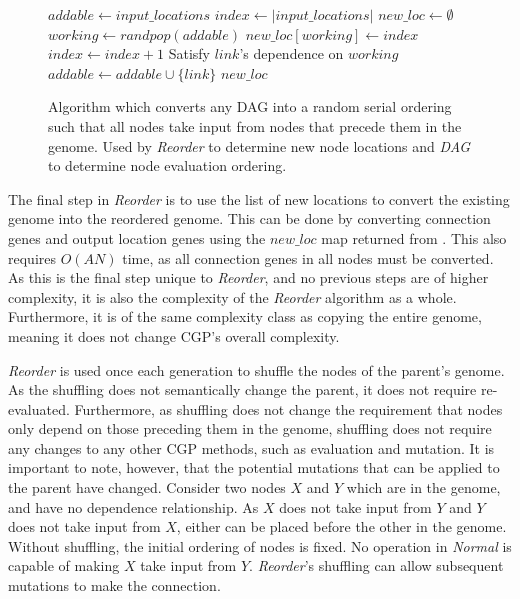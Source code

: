 \documentclass[journal]{IEEEtran}
\begin{document}
\begin{figure}
  \begin{algorithmic}
    \State $addable \leftarrow input\_locations$
    \State $index \leftarrow |input\_locations|$
    \State $new\_loc \leftarrow \emptyset$
      \State $working \leftarrow randpop(addable)$
        \State $new\_loc[working] \leftarrow index$
        \State $index \leftarrow index + 1$
      \EndIf
        \State Satisfy $link$'s dependence on $working$
          \State $addable \leftarrow addable \cup \{link\}$
        \EndIf
      \EndFor
    \EndWhile
    \State\Return $new\_loc$
    \EndProcedure
  \end{algorithmic}
  \caption{Algorithm which converts any DAG into a random serial ordering such
           that all nodes take input from nodes that precede them in the genome.
           Used by \emph{Reorder} to determine new node locations and \emph{DAG} to
           determine node evaluation ordering.}
  \label{fig:reorder}
\end{figure}

The final step in \emph{Reorder} is to use the list of new locations to convert
the existing genome into the reordered genome.  This can be done
by converting connection genes and output location genes using
the $new\_loc$ map returned from .
This also requires $O(AN)$ time, as all connection genes in all nodes must
be converted.  As this is the final step unique to \emph{Reorder}, and
no previous steps are of higher complexity, it is also the complexity of
the \emph{Reorder} algorithm as a whole.  Furthermore, it is of the same complexity class
as copying the entire genome, meaning it does not change CGP's overall complexity.

\emph{Reorder} is used once each generation to shuffle the nodes of the parent's
genome.  As the shuffling does not semantically change the parent, it does
not require re-evaluated.  Furthermore, as shuffling does not change the requirement
that nodes only depend on those preceding them in the genome, shuffling does not
require any changes to any other CGP methods, such as evaluation and mutation.
It is important to note, however, that the potential mutations that can be applied to the parent
have changed.  Consider two nodes $X$ and $Y$ which are in the genome, and
have no dependence relationship.  As $X$ does not take input from $Y$ and
$Y$ does not take input from $X$, either can be placed before the other
in the genome.  Without shuffling, the initial ordering of nodes is fixed.
No operation in \emph{Normal} is capable of making $X$
take input from $Y$.  \emph{Reorder}'s shuffling can allow
subsequent mutations to make the connection.
\end{document}
